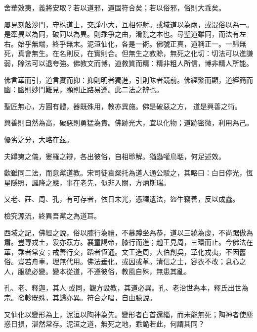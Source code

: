 \begin{pinyinscope}
 舍華效夷，義將安取？若以道邪，道固符合矣；若以俗邪，俗則大乖矣。



 屢見刻舷沙門，守株道士，交諍小大，互相彈射。或域道以為兩，或混俗以為一。是牽異以為同，破同以為異。則乖爭之由，淆亂之本也。尋聖道雖同，而法有左右。始乎無端，終乎無末。泥洹仙化，各是一術。佛號正真，道稱正一。一歸無死，真會無生。在名則反，在實則合。但無生之教賒，無死之化切：切法可以進謙弱，賒法可以退夸強。佛教文而博，道教質而精：精非粗人所信，博非精人所能。



 佛言華而引，道言實而抑：抑則明者獨進，引則昧者競前。佛經繁而顯，道經簡而幽：幽則妙門難見，顯則正路易遵。此二法之辨也。



 聖匠無心，方圓有體，器既殊用，教亦異施。佛是破惡之方，
 道是興善之術。



 興善則自然為高，破惡則勇猛為貴。佛跡光大，宜以化物；道跡密微，利用為己。



 優劣之分，大略在茲。



 夫蹲夷之儀，婁羅之辯，各出彼俗，自相聆解。猶蟲嚾鳥聒，何足述效。



 歡雖同二法，而意黨道教。宋司徒袁粲托為道人通公駁之，其略曰：白日停光，恆星隱照，誕降之應，事在老先，似非入關，方炳斯瑞。



 又老、莊、周、孔，有可存者，依日末光，憑釋遺法，盜牛竊善，反以成蠹。



 檢究源流，終異吾黨之為道耳。



 西域之記，佛經之說，俗以膝行為禮，不慕蹲坐為恭，道以三繞為虔，不尚踞傲為肅。豈專戎土，爰亦茲方。襄童謁帝，膝行而進；趙王見周，三環而止。今佛法在華，乘者常安；戒善行交，蹈者恆通。文王造周，大伯創吳，革化戎夷，不因舊俗。豈若舟車，理無代用。佛法垂化，或因或革。清信之士，容衣不改；息心之人，服貌必變。變本從道，不遵彼俗，教風自殊，無患其亂。



 孔、老、釋迦，其人
 或同，觀方設教，其道必異。孔、老治世為本，釋氏出世為宗。發軫既殊，其歸亦異。符合之唱，自由臆說。



 又仙化以變形為上，泥洹以陶神為先。變形者白首還緇，而未能無死；陶神者使塵惑日損，湛然常存。泥洹之道，無死之地，乖詭若此，何謂其同？




\end{pinyinscope}
